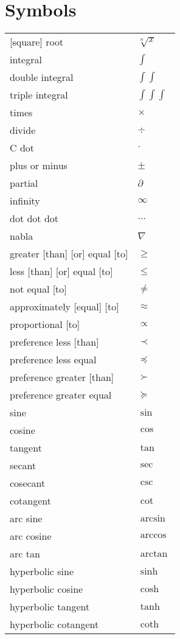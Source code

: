 \documentclass[12pt]{article}
\begin{document}
\section{Symbols}

\begin{longtable}{ l l}
[square] root & $\sqrt[n]{x}$ \\
integral & $\int$ \\
double integral & $\int \int$ \\
triple integral & $\int \int \int$ \\
times & $\times$ \\
divide & $\div$ \\
C dot & $\cdot$ \\
plus or minus & $\pm$ \\
partial & $\partial$ \\
infinity & $\infty$ \\
dot dot dot & $\dots$ \\
nabla & $\nabla$ \\
greater [than] [or] equal [to] & $\geq$ \\
less [than] [or] equal [to] & $\leq$ \\
not equal [to] & $\neq$ \\
approximately [equal] [to] & $\approx$ \\
proportional [to] & $\propto$ \\
preference less [than] & $\prec$ \\
preference less equal & $\preceq$ \\
preference greater [than] & $\succ$ \\
preference greater equal & $\succeq$ \\
sine & $\sin$ \\
cosine & $\cos$ \\
tangent & $\tan$ \\
secant & $\sec$ \\
cosecant & $\csc$ \\
cotangent & $\cot$ \\
arc sine & $\arcsin$ \\
arc cosine & $\arccos$ \\
arc tan & $\arctan$ \\
hyperbolic sine & $\sinh$ \\
hyperbolic cosine & $\cosh$ \\
hyperbolic tangent & $\tanh$ \\
hyperbolic cotangent & $\coth$ \\

\end{longtable}
\end{document}
